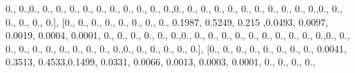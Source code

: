 \documentclass[
]{book}
\newenvironment{Shaded}{\begin{snugshade}}{\end{snugshade}}
\newcommand{\FloatTok}[1]{\textcolor[rgb]{0.00,0.00,0.81}{#1}}
\newcommand{\NormalTok}[1]{#1}
\begin{document}
\begin{Shaded}
\begin{Highlighting}[]
\FloatTok{0.}\NormalTok{, }\FloatTok{0.}\NormalTok{,}\FloatTok{0.}\NormalTok{, }\FloatTok{0.}\NormalTok{, }\FloatTok{0.}\NormalTok{, }\FloatTok{0.}\NormalTok{, }\FloatTok{0.}\NormalTok{, }\FloatTok{0.}\NormalTok{, }\FloatTok{0.}\NormalTok{, }\FloatTok{0.}\NormalTok{, }\FloatTok{0.}\NormalTok{, }\FloatTok{0.}\NormalTok{, }\FloatTok{0.}\NormalTok{,}\FloatTok{0.}\NormalTok{, }\FloatTok{0.}\NormalTok{, }\FloatTok{0.}\NormalTok{, }\FloatTok{0.}\NormalTok{, }\FloatTok{0.}\NormalTok{, }\FloatTok{0.}\NormalTok{, }\FloatTok{0.}\NormalTok{,}
\FloatTok{0.}\NormalTok{, }\FloatTok{0.}\NormalTok{, }\FloatTok{0.}\NormalTok{, }\FloatTok{0.}\NormalTok{,}\FloatTok{0.}\NormalTok{, }\FloatTok{0.}\NormalTok{, }\FloatTok{0.}\NormalTok{, }\FloatTok{0.}\NormalTok{, }\FloatTok{0.}\NormalTok{, }\FloatTok{0.}\NormalTok{], [}\FloatTok{0.}\NormalTok{, }\FloatTok{0.}\NormalTok{, }\FloatTok{0.}\NormalTok{, }\FloatTok{0.}\NormalTok{, }\FloatTok{0.}\NormalTok{, }\FloatTok{0.}\NormalTok{, }\FloatTok{0.}\NormalTok{, }\FloatTok{0.}\NormalTok{, }\FloatTok{0.1987}\NormalTok{,}
\FloatTok{0.5249}\NormalTok{, }\FloatTok{0.215}\NormalTok{ ,}\FloatTok{0.0493}\NormalTok{, }\FloatTok{0.0097}\NormalTok{, }\FloatTok{0.0019}\NormalTok{, }\FloatTok{0.0004}\NormalTok{, }\FloatTok{0.0001}\NormalTok{, }\FloatTok{0.}\NormalTok{, }\FloatTok{0.}\NormalTok{, }\FloatTok{0.}\NormalTok{, }\FloatTok{0.}\NormalTok{, }\FloatTok{0.}\NormalTok{,}
\FloatTok{0.}\NormalTok{,}\FloatTok{0.}\NormalTok{, }\FloatTok{0.}\NormalTok{, }\FloatTok{0.}\NormalTok{, }\FloatTok{0.}\NormalTok{, }\FloatTok{0.}\NormalTok{, }\FloatTok{0.}\NormalTok{, }\FloatTok{0.}\NormalTok{, }\FloatTok{0.}\NormalTok{, }\FloatTok{0.}\NormalTok{, }\FloatTok{0.}\NormalTok{, }\FloatTok{0.}\NormalTok{,}\FloatTok{0.}\NormalTok{, }\FloatTok{0.}\NormalTok{, }\FloatTok{0.}\NormalTok{, }\FloatTok{0.}\NormalTok{, }\FloatTok{0.}\NormalTok{, }\FloatTok{0.}\NormalTok{, }\FloatTok{0.}\NormalTok{, }\FloatTok{0.}\NormalTok{,}
\FloatTok{0.}\NormalTok{, }\FloatTok{0.}\NormalTok{, }\FloatTok{0.}\NormalTok{,}\FloatTok{0.}\NormalTok{, }\FloatTok{0.}\NormalTok{, }\FloatTok{0.}\NormalTok{, }\FloatTok{0.}\NormalTok{, }\FloatTok{0.}\NormalTok{, }\FloatTok{0.}\NormalTok{], [}\FloatTok{0.}\NormalTok{, }\FloatTok{0.}\NormalTok{, }\FloatTok{0.}\NormalTok{, }\FloatTok{0.}\NormalTok{, }\FloatTok{0.}\NormalTok{, }\FloatTok{0.}\NormalTok{, }\FloatTok{0.}\NormalTok{, }\FloatTok{0.}\NormalTok{, }\FloatTok{0.0041}\NormalTok{,}
\FloatTok{0.3513}\NormalTok{, }\FloatTok{0.4533}\NormalTok{,}\FloatTok{0.1499}\NormalTok{, }\FloatTok{0.0331}\NormalTok{, }\FloatTok{0.0066}\NormalTok{, }\FloatTok{0.0013}\NormalTok{, }\FloatTok{0.0003}\NormalTok{, }\FloatTok{0.0001}\NormalTok{, }\FloatTok{0.}\NormalTok{, }\FloatTok{0.}\NormalTok{, }\FloatTok{0.}\NormalTok{, }\FloatTok{0.}\NormalTok{,}

\end{Highlighting}
\end{Shaded}
\end{document}

